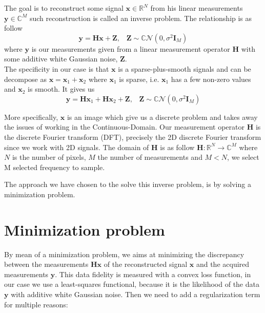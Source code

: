 \documentclass[a4paper,11pt,oneside]{report}
\theoremstyle{named}
\begin{document}
The goal is to reconstruct some signal $\boldsymbol{x} \in \mathbb{R}^N$ from his linear measurements $\boldsymbol{y} \in \mathbb{C}^M$ such reconstruction is called an inverse problem. The relationship is as follow
\begin{equation}
    \boldsymbol{y} = \boldsymbol{H x} + \boldsymbol{Z}, \hspace{10pt} \boldsymbol{Z} \sim \mathbb{C} \mathcal{N}(0, \sigma^2 \boldsymbol{I}_M)
\end{equation}
where $\boldsymbol{y}$ is our measurements given from a linear measurement operator $\boldsymbol{H}$ with some additive white Gaussian noise, $\boldsymbol{Z}$. \\
The specificity in our case is that $\boldsymbol{x}$ is a sparse-plus-smooth signals and can be decompose as $\boldsymbol{x} = \boldsymbol{x}_1 + \boldsymbol{x}_2$ where $\boldsymbol{x}_1$ is sparse, i.e. $\boldsymbol{x}_1$  has a few non-zero values and $\boldsymbol{x}_2$ is smooth. It gives us 
\begin{equation} \label{eq:1}
    \boldsymbol{y} = \boldsymbol{H x}_1 + \boldsymbol{H x}_2 + \boldsymbol{Z}, \hspace{10pt} \boldsymbol{Z} \sim \mathbb{C} \mathcal{N}(0, \sigma^2 \boldsymbol{I}_M)
\end{equation}

More specifically, $\boldsymbol{x}$ is an image which give us a discrete problem and takes away the issues of working in the Continuous-Domain. Our measurement operator $\boldsymbol{H}$ is the discrete Fourier transform (DFT), precisely the 2D discrete Fourier transform since we work with 2D signals. The domain of $\boldsymbol{H}$ is as follow \( \boldsymbol{H} : \mathbb{R}^N \xrightarrow{} \mathbb{C}^M\) where $N$ is the number of pixels, $M$ the number of measurements and $M < N$, we select M selected frequency to sample.

 The approach we have chosen to the solve this inverse problem, is by solving a minimization problem.

\section{Minimization problem}
By mean of a minimization problem, we aims at minimizing the discrepancy between the measurements $\boldsymbol{H x}$ of the reconstructed signal $\boldsymbol{x}$ and the acquired measurements $\boldsymbol{y}$. This data fidelity is measured with a convex loss function, in our case we use a least-squares functional, because it is the likelihood of the data $\boldsymbol{y}$ with additive white Gaussian noise. Then we need to add a regularization term for multiple reasons:
\end{document}
